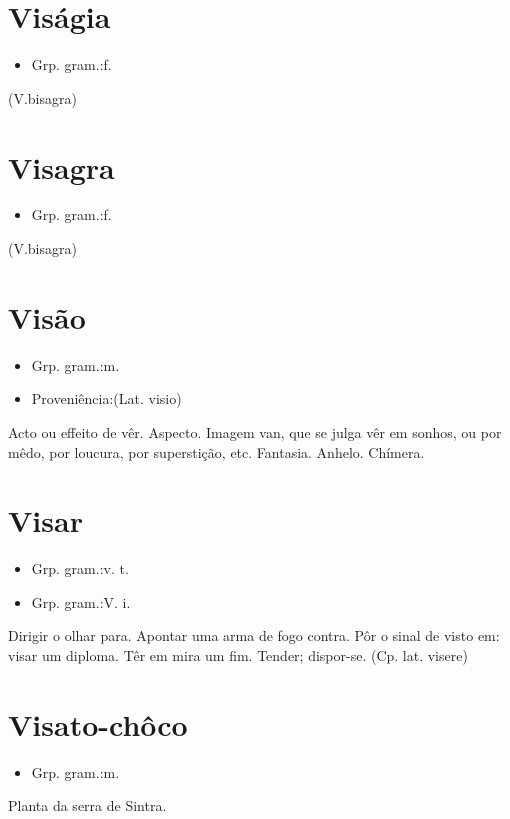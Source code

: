 \documentclass{article}
\begin{document}
\section{Viságia}
\begin{itemize}
\item {Grp. gram.:f.}
\end{itemize}
(V.bisagra)
\section{Visagra}
\begin{itemize}
\item {Grp. gram.:f.}
\end{itemize}
(V.bisagra)
\section{Visão}
\begin{itemize}
\item {Grp. gram.:m.}
\end{itemize}
\begin{itemize}
\item {Proveniência:(Lat. \textunderscore visio\textunderscore )}
\end{itemize}
Acto ou effeito de vêr.
Aspecto.
Imagem van, que se julga vêr em sonhos, ou por mêdo, por loucura, por superstição, etc.
Fantasia.
Anhelo.
Chímera.
\section{Visar}
\begin{itemize}
\item {Grp. gram.:v. t.}
\end{itemize}
\begin{itemize}
\item {Grp. gram.:V. i.}
\end{itemize}
Dirigir o olhar para.
Apontar uma arma de fogo contra.
Pôr o sinal de visto em: \textunderscore visar um diploma\textunderscore .
Têr em mira um fim.
Tender; dispor-se.
(Cp. lat. \textunderscore visere\textunderscore  )
\section{Visato-chôco}
\begin{itemize}
\item {Grp. gram.:m.}
\end{itemize}
Planta da serra de Sintra.
\end{document}
